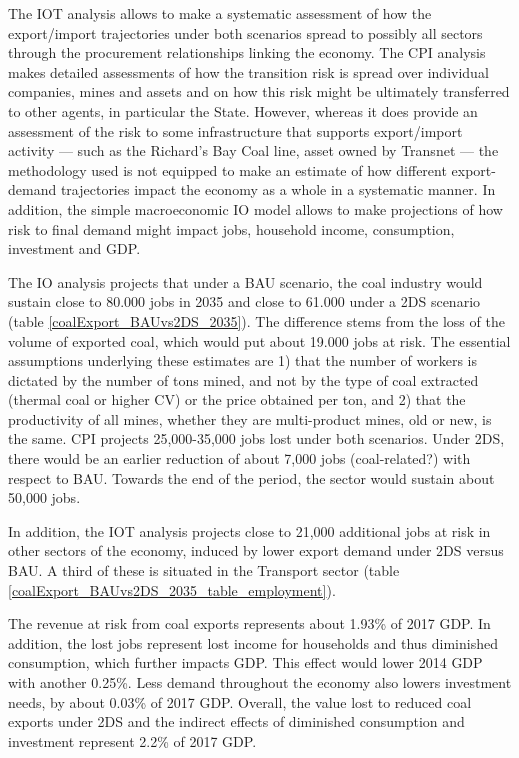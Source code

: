 \documentclass[12pt,english]{article}
\newcommand\lies[2][]{\todo[color=orange!50,#1]{ldf: #2}}
\begin{document}
The IOT analysis %
allows to make a systematic assessment of how the export/import trajectories under both scenarios spread to possibly all sectors through the procurement relationships linking the economy.	%
The CPI analysis makes detailed assessments of how the transition risk is spread over individual companies, mines and assets and on how this risk might be ultimately transferred to other agents, in particular the State. However, whereas it does provide an assessment of the risk to some infrastructure that supports export/import activity --- such as the Richard's Bay Coal line, asset owned by Transnet --- the methodology used is not equipped to make an estimate of how %
different export-demand trajectories impact the economy as a whole in a systematic manner. In addition, the simple macroeconomic IO model allows to make projections of how risk to final demand might impact jobs, household income, consumption, investment and GDP.

The IO analysis projects that under a BAU scenario, the coal industry would sustain close to 80.000 jobs in 2035 and close to 61.000 under a 2DS scenario (table \ref{coalExport_BAUvs2DS_2035}). The difference stems from the loss of the volume of exported coal, which would put about 19.000 jobs at risk. The essential assumptions underlying these estimates are 1) that the number of workers is dictated by the number of tons mined, and not by the type of coal extracted (thermal coal or higher CV) or the price obtained per ton, and 2) that the productivity of all mines, whether they are multi-product mines, old or new, is the same. CPI \lies{Why the very similar projections under BAU and 2DS ?} projects 25,000-35,000 jobs lost under both scenarios. Under 2DS, there would be an earlier reduction of about 7,000 jobs (coal-related?) with respect to BAU. Towards the end of the period, the sector would sustain about 50,000 jobs. 

In addition, the IOT analysis projects close to 21,000 additional jobs at risk in other sectors of the economy, induced by lower export demand under 2DS versus BAU. A third of these is situated in the Transport sector (table \ref{coalExport_BAUvs2DS_2035_table_employment}).

The revenue at risk from coal exports represents about 1.93\% of 2017 GDP. In addition, the lost jobs represent lost income for households and thus diminished consumption, which further impacts GDP. This effect would lower 2014 GDP with another 0.25\%. %
Less demand throughout the economy also lowers investment needs, by about 0.03\% of 2017 GDP. Overall, the value lost to reduced coal exports under 2DS and the indirect effects of diminished consumption and investment represent 2.2\% of 2017 GDP.
\end{document}
